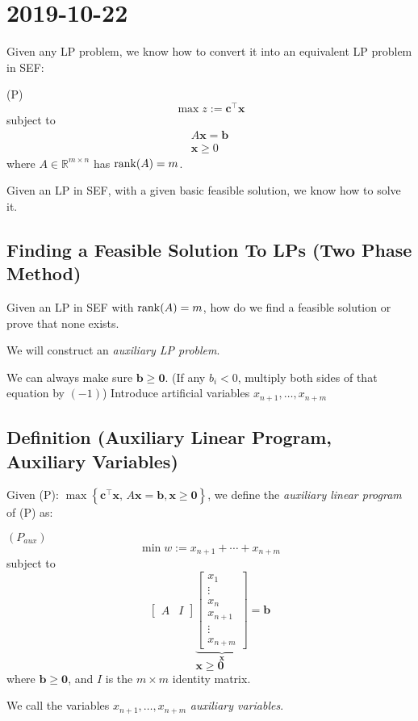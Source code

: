 \section{2019-10-22}
Given any LP problem, we know how to convert it into an equivalent LP
problem in SEF:

(P)
\[\max z:=\bm{c}^\top \bm{x}\]
subject to
\begin{align*}
    A \bm{x}=\bm{b}\\
    \bm{x}\ge 0
\end{align*}
where $ A\in\mathbb{R}^{m\times n}$ has $\operatorname{rank}(A)=m $.

Given an LP in SEF, with a given basic feasible solution, we know
how to solve it.

\subsection{Finding a Feasible Solution To LPs (Two Phase Method)}
Given an LP in SEF with $ \operatorname{rank}(A)=m $, how do we find a feasible
solution or prove that none exists.

We will construct an \emph{auxiliary LP problem}.

We can always make sure $ \bm{b}\ge \bm{0} $. (If any $ b_i<0 $, multiply both
sides of that equation by $ (-1) $) Introduce artificial variables
$ x_{n+1},\ldots,x_{n+m} $

\begin{defbox}
    \subsection{Definition (Auxiliary Linear Program, Auxiliary Variables)}
    Given (P): $\max \left\{ \bm{c}^\top \bm{x},\,A \bm{x}=\bm{b},\bm{x}\ge \bm{0} \right\}$,
    we define the \emph{auxiliary linear program} of (P) as:

    $ (P_{aux}) $
    \[ \min w:=x_{n+1}+\cdots+x_{n+m} \]
    subject to
    \[
        \left[\begin{array}{c|c}
            A & I
        \end{array}\right]
        \underbrace{\begin{bmatrix}
            x_1\\
            \vdots\\
            x_{n}\\
            x_{n+1}\\
            \vdots\\
            x_{n+m}
        \end{bmatrix}}_{\bm{x}}
        =\bm{b}\]
    \[ \bm{x} \ge \bm{0}\]
    where $ \bm{b}\ge \bm{0} $, and $ I $ is the $ m\times m $ identity matrix.

    We call the variables $ x_{n+1},\ldots,x_{n+m} $ \emph{auxiliary variables}.
\end{defbox}

